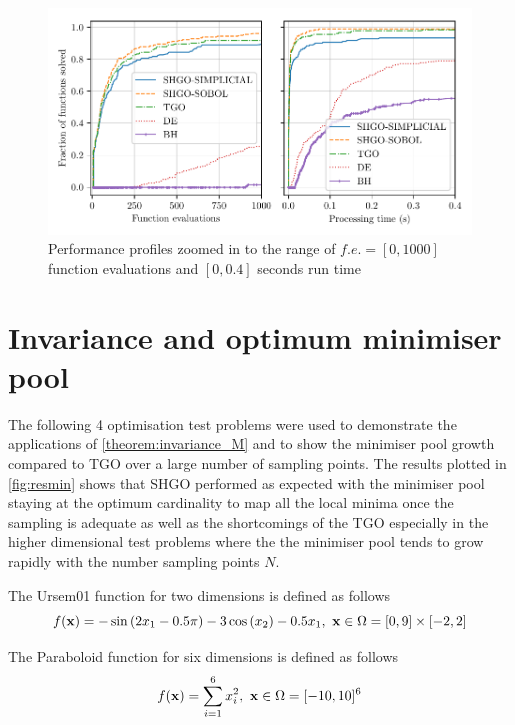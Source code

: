 \begin{figure} %
\centerline{\includegraphics[scale=0.83]{./Fig13.pdf}}
{\caption{Performance profiles zoomed in to the range of $f.e.=[0, 1000]$ function evaluations and $[0, 0.4]$ seconds run time} \label{fig:pprofilezoom}} 
\end{figure}

\section{Invariance and optimum minimiser pool}
The following 4 optimisation test problems were used to demonstrate the applications of \autoref{theorem:invariance_M} and to show the minimiser pool growth compared to TGO over a large number of sampling points. The results plotted in \autoref{fig:resmin} shows that SHGO performed as expected with the minimiser pool staying at the optimum cardinality to map all the local minima once the sampling is adequate as well as the shortcomings of the TGO especially in the higher dimensional test problems where the the minimiser pool tends to grow rapidly with the number sampling points $N$.

The Ursem01 function for two dimensions is defined as follows \cite{Gavana2016}
\begin{equation} \label{eq:Ursem01}
f(\bold{x}) =  \displaystyle - \sin{\left(2 x_1  - 0.5 \pi \right) - 3 \cos{\left(x_2\right)}} - 0.5 x_1 , ~ \bold{x} \in \Omega =  [0, 9] \times [-2, 2] 
\end{equation}

The Paraboloid function for six dimensions is defined as follows %
\begin{equation} \label{eq:Paraboloid }
f(\bold{x}) =  \displaystyle \sum^6_{i=1} x_i^2, ~ \bold{x} \in \Omega =  [-10, 10]^6 
\end{equation}

